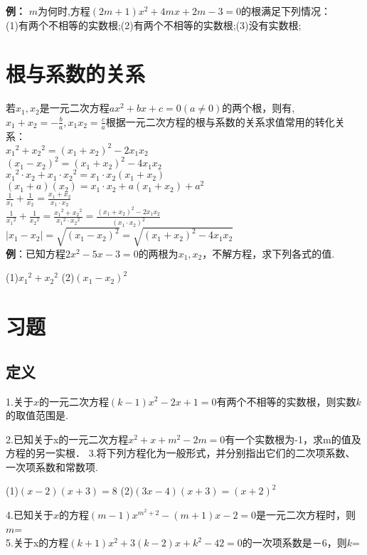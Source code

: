 \textbf{例：} $m$为何时,方程$(2m+1)x^2+4mx+2m-3=0$的根满足下列情况：\\
(1)有两个不相等的实数根;\hfill (2)有两个不相等的实数根;\hfill (3)没有实数根;\\
\vspace{2cm}

\section{根与系数的关系}
若$x_1,x_2$是一元二次方程$ax^2+bx+c=0(a\neq 0 )$的两个根，则有,$x_1+x_2=-\frac{b}{a},x_1x_2=\frac{c}{a} $根据一元二次方程的根与系数的关系求值常用的转化关系：\\
${x_1}^2+{x_2}^2=(x_1+x_2)^2-2x_1x_2$ \\
$(x_1-x_2)^2=(x_1+x_2)^2-4x_1x_2$\\
${x_1}^2\cdot x_2+x_1\cdot {x_2}^2=x_1\cdot x_2(x_1+x_2)$ \\
$(x_1+a)(x_2)=x_1\cdot x_2+a(x_1+x_2)+a^2$ \\
$\frac{1}{x_1}+\frac{1}{x_2}=\frac{x_1+x_2}{x_1\cdot x_2}$ \\
$\frac{1}{{x_1}^2}+\frac{1}{{x_2}^2}=\frac{{x_1}^2+{x_2}^2}{{x_1}^2\cdot {x_2}^2}=\frac{(x_1+x_2)^2-2x_1x_2}{(x_1\cdot x_2)^2}$ \\
$|x_1-x_2|=\sqrt{(x_1-x_2)^2}=\sqrt{(x_1+x_2)^2-4x_1 x_2}$ \\
\textbf{例}：已知方程$2x^2-5x-3=0$的两根为$x_1,x_2$，不解方程，求下列各式的值.\par
(1)${x_1}^2+{x_2}^2$ \hspace{5cm} (2)$(x_1-x_2)^2$
\section{习题}
\subsection{定义}
1.关于$x$的一元二次方程$(k-1)x^2-2x+1=0$有两个不相等的实数根，则实数$k$的取值范围是.\par
2.已知关于x的一元二次方程$x^2+x+m^2-2m=0$有一个实数根为-1，求m的值及方程的另一实根．
3.将下列方程化为一般形式，并分别指出它们的二次项系数、一次项系数和常数项.

(1)$(x-2)(x+3)=8$  \hspace{3cm}    (2)$(3x-4)(x+3)=(x+2)^2$\\
\vspace{2cm}

4.已知关于$x$的方程$(m-1)x^{m^2+2}-(m+1)x-2=0$是一元二次方程时，则$m$= \\
5.关于x的方程$(k+1)x^2+3(k-2)x+k^2-42=0$的一次项系数是－6，则$k$=\\
